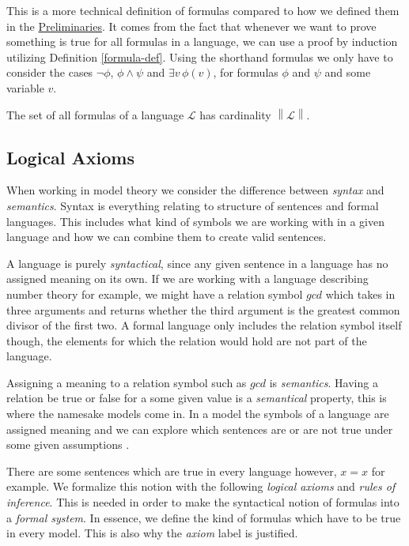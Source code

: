\documentclass[../../main.tex]{subfiles}
\begin{document}
This is a more technical definition of formulas compared to how we defined them in the \hyperref[preliminaries]{Preliminaries}.
It comes from the fact that whenever we want to prove something is true for all formulas in a language, 
we can use a proof by induction utilizing Definition \ref{formula-def}.
Using the shorthand formulas we only have to consider the cases $\lnot \phi$, $\phi \wedge \psi$ and $\exists v\, \phi(v)$,
for formulas $\phi$ and $\psi$ and some variable $v$.

\begin{proposition}\label{language-cardinality}\cite[Proposition 1.3.4.]{Cha90}
    The set of all formulas of a language $\mathcal{L}$ has cardinality $\left\lVert\mathcal{L}\right\rVert$.
\end{proposition}

\subsection{Logical Axioms}

When working in model theory we consider the difference between \textit{syntax} and \textit{semantics}.
Syntax is everything relating to structure of sentences and formal languages.
This includes what kind of symbols we are working with in a given language and how we can combine them to create valid sentences.

A language is purely \textit{syntactical}, since any given sentence in a language has no assigned meaning on its own.
If we are working with a language describing number theory for example, 
we might have a relation symbol $gcd$ which takes in three arguments and returns whether the third argument is the greatest common divisor of the first two.
A formal language only includes the relation symbol itself though, the elements for which the relation would hold are not part of the language.

Assigning a meaning to a relation symbol such as $gcd$ is \textit{semantics}.
Having a relation be true or false for a some given value is a \textit{semantical} property, this is where the namesake models come in.
In a model the symbols of a language are assigned meaning and we can explore which sentences are or are not true under some given assumptions \cite[p.3]{Cha90}.

There are some sentences which are true in every language however, $x = x$ for example.
We formalize this notion with the following \textit{logical axioms} and \textit{rules of inference}.
This is needed in order to make the syntactical notion of formulas into a \textit{formal system}.
In essence, we define the kind of formulas which have to be true in every model.
This is also why the \textit{axiom} label is justified.
\end{document}
